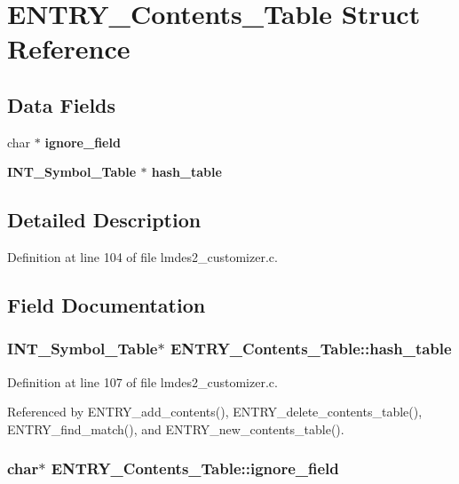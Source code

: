 \section{ENTRY\_\-Contents\_\-Table Struct Reference}
\label{structENTRY__Contents__Table}
\subsection*{Data Fields}
\begin{CompactItemize}
\item 
char $\ast$ \bf{ignore\_\-field}
\item 
\bf{INT\_\-Symbol\_\-Table} $\ast$ \bf{hash\_\-table}
\end{CompactItemize}


\subsection{Detailed Description}




Definition at line 104 of file lmdes2\_\-customizer.c.

\subsection{Field Documentation}
\subsubsection{\setlength{\rightskip}{0pt plus 5cm}\bf{INT\_\-Symbol\_\-Table}$\ast$ \bf{ENTRY\_\-Contents\_\-Table::hash\_\-table}}\label{structENTRY__Contents__Table_849c8abfa8c7e646434e26dbfa80fada}




Definition at line 107 of file lmdes2\_\-customizer.c.

Referenced by ENTRY\_\-add\_\-contents(), ENTRY\_\-delete\_\-contents\_\-table(), ENTRY\_\-find\_\-match(), and ENTRY\_\-new\_\-contents\_\-table().
\subsubsection{\setlength{\rightskip}{0pt plus 5cm}char$\ast$ \bf{ENTRY\_\-Contents\_\-Table::ignore\_\-field}}\label{structENTRY__Contents__Table_ce208a4e15a5fadc43a213d8a4a24dd1}




